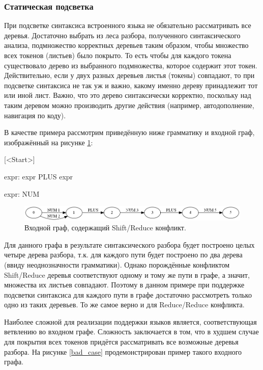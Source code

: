 \subsubsection{Статическая подсветка}
При подсветке синтаксиса встроенного языка не обязательно рассматривать все деревья. Достаточно выбрать из леса разбора, полученного синтаксического анализа, подмножество корректных деревьев таким образом, чтобы множество всех токенов (листьев) было покрыто. То есть чтобы для каждого токена существовало дерево из выбранного подмножества, которое содержит этот токен. Действительно, если у двух разных деревьев листья (токены) совпадают, то при подсветке синтаксиса не так уж и важно, какому именно дереву принадлежит тот или иной лист. Важно, что это дерево синтаксически корректно, поскольку над таким деревом можно производить другие действия (например, автодополнение, навигация по коду).

В качестве примера рассмотрим приведённую ниже грамматику и входной граф, изображённый на рисунке \ref{shift_reduce_conflict}:

[<Start>]

expr: expr PLUS expr 

expr: NUM

\begin{figure}[h]
\centering
\includegraphics[width=150mm]{Pictures/Conflict.png}
\caption{Входной граф, содержащий Shift/Reduce конфликт.}
\label{shift_reduce_conflict}
\end{figure}

Для данного графа в результате синтаксического разбора будет построено целых четыре дерева разбора, т.к. для каждого пути будет построено по два дерева (ввиду неоднозначности грамматики). Однако порождённые конфликтом Shift/Reduce деревья соответствуют одному и тому же пути в графе, а значит, множества их листьев совпадают. Поэтому в данном примере при поддержке подсветки синтаксиса для каждого пути в графе достаточно рассмотреть только одно из таких деревьев. То же самое верно и для Reduce/Reduce конфликта. 

Наиболее сложной для реализации поддержки языков является, соответствующая ветвлению во входном графе. Сложность заключается в том, что в худшем случае для покрытия всех токенов придётся рассматривать все возможные деревья разбора. На рисунке \ref{bad_case} продемонстрирован пример такого входного графа. 

